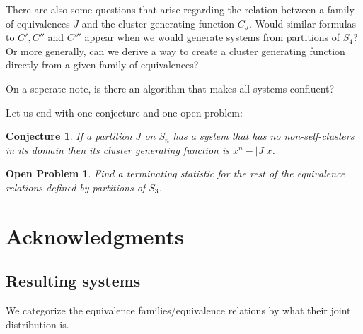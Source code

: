 \documentclass[a4paper, 11pt, english]{article}
\newtheorem{openproblem}[theorem]{Open Problem}
\newtheorem{conjecture}[theorem]{Conjecture}
\theoremstyle{definition}
\newcommand{\Sym}{S}
\begin{document}
There are also some questions that arise regarding the relation between a family of equivalences $J$ and
the cluster generating function $C_J$.
Would similar formulas to $C', C''$ and $C'''$ appear when we would
generate systems from partitions of $\Sym_4$? 
Or more generally, 
can we derive a way to create a cluster generating function directly from a
given family of equivalences? 

On a seperate note,
is there an algorithm that makes all systems confluent?

Let us end with one conjecture and one open problem:
\begin{conjecture}
    If a partition $J$ on $\Sym_n$ has a system that has no non-self-clusters in
    its domain then its cluster generating function is $x^n-|J|x$.
\end{conjecture}

\begin{openproblem}
    Find a terminating statistic for the rest of the equivalence relations
    defined by partitions of $\Sym_3$.
\end{openproblem}

\section*{Acknowledgments}




\clearpage

\begin{appendices}

\clearpage

\section{Resulting systems}
We categorize the equivalence families/equivalence relations by what their joint
distribution is.
\begin{multicols}{2}

\end{multicols}
\end{appendices}
\end{document}
